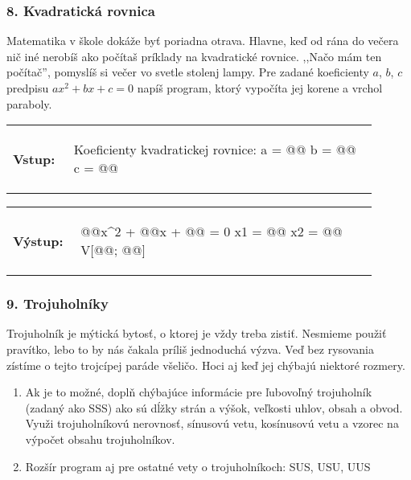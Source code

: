 \subsubsection*{8. Kvadratická rovnica}
Matematika v škole dokáže byť poriadna otrava. Hlavne, keď od rána do večera nič iné nerobíš ako počítaš príklady na kvadratické rovnice. ,,Načo mám ten počítač'', pomyslíš si večer vo svetle stolenj lampy. Pre zadané koeficienty $a$, $b$, $c$ predpisu $ax^2 + bx + c = 0$ napíš program, ktorý vypočíta jej korene a vrchol paraboly.

\begin{tabular}{@{}p{0.15\linewidth}p{0.75\linewidth}}
\textbf{\small Vstup:} &
\vspace{-3em}
\begin{code}
Koeficienty kvadratickej rovnice:
a = @\fbox{\phantom{vstup}}@
b = @\fbox{\phantom{vstup}}@
c = @\fbox{\phantom{vstup}}@
\end{code}
\end{tabular}

\vspace{-2em}
\begin{tabular}{@{}p{0.15\linewidth}p{0.75\linewidth}}
\textbf{\small Výstup:} &
\vspace{-3em}
\begin{code}
@\fbox{\phantom{a}}@x^2 + @\fbox{\phantom{b}}@x + @\fbox{\phantom{c}}@ = 0
x1 = @\fbox{\phantom{abc}}@
x2 = @\fbox{\phantom{abc}}@
V[@\fbox{\phantom{abc}}@; @\fbox{\phantom{abc}}@]
\end{code}
\end{tabular}
\vspace{-2em}


\subsubsection*{9. Trojuholníky}
Trojuholník je mýtická bytosť, o ktorej je vždy treba zistiť. Nesmieme použiť pravítko, lebo to by nás čakala príliš jednoduchá výzva. Veď bez rysovania zístíme o tejto trojcípej paráde všeličo. Hoci aj keď jej chýbajú niektoré rozmery.

\begin{enumerate}[label=\alph*)]
\item Ak je to možné, doplň chýbajúce informácie pre ľubovoľný trojuholník (zadaný ako SSS) ako sú dĺžky strán a výšok, veľkosti uhlov, obsah a obvod. Využi trojuholníkovú nerovnosť, sínusovú vetu, kosínusovú vetu a vzorec na výpočet obsahu trojuholníkov.
\item Rozšír program aj pre ostatné vety o trojuholníkoch: SUS, USU, UUS
\end{enumerate}

